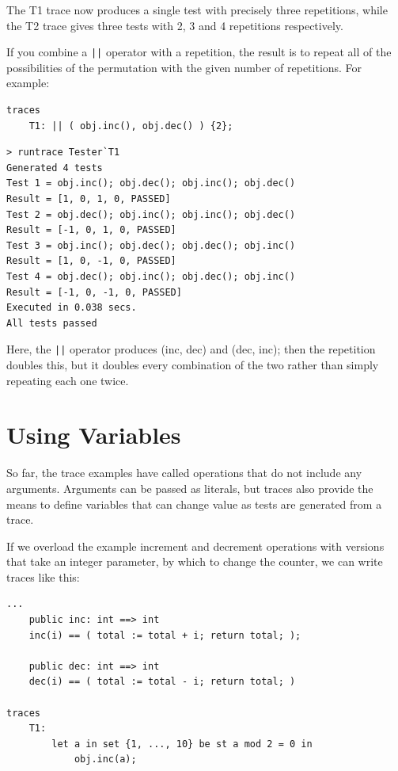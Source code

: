 \documentclass{overturerepchap}
\begin{document}
The T1 trace now produces a single test with precisely three repetitions, while
the T2 trace gives three tests with 2, 3 and 4 repetitions respectively.

If you combine a \texttt{||} operator with a repetition, the result is to repeat
all of the possibilities of the permutation with the given number of repetitions.
For example:

\small
\begin{lstlisting}
traces
    T1: || ( obj.inc(), obj.dec() ) {2};
\end{lstlisting}

\begin{verbatim}
> runtrace Tester`T1
Generated 4 tests
Test 1 = obj.inc(); obj.dec(); obj.inc(); obj.dec()
Result = [1, 0, 1, 0, PASSED]
Test 2 = obj.dec(); obj.inc(); obj.inc(); obj.dec()
Result = [-1, 0, 1, 0, PASSED]
Test 3 = obj.inc(); obj.dec(); obj.dec(); obj.inc()
Result = [1, 0, -1, 0, PASSED]
Test 4 = obj.dec(); obj.inc(); obj.dec(); obj.inc()
Result = [-1, 0, -1, 0, PASSED]
Executed in 0.038 secs. 
All tests passed
\end{verbatim}
\normalsize

Here, the \texttt{||} operator produces (inc, dec) and (dec, inc); then the
repetition doubles this, but it doubles every combination of the two rather than
simply repeating each one twice.

\section{Using Variables}

So far, the trace examples have called operations that do not include any
arguments. Arguments can be passed as literals, but traces also provide the
means to define variables that can change value as tests are generated from a
trace.

If we overload the example increment and decrement operations with versions that
take an integer parameter, by which to change the counter, we can write traces
like this:

\small
\begin{lstlisting}
...
    public inc: int ==> int
    inc(i) == ( total := total + i; return total; );

    public dec: int ==> int
    dec(i) == ( total := total - i; return total; )

traces
    T1:
        let a in set {1, ..., 10} be st a mod 2 = 0 in
            obj.inc(a);
\end{lstlisting}
\end{document}
